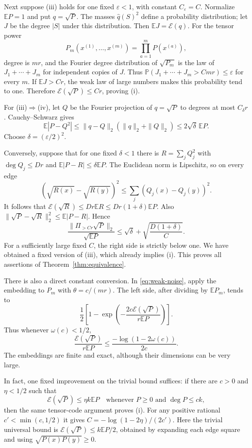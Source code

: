 \documentclass[10pt]{article}
\newcommand{\E}{\mathbb E}
\newcommand{\Prb}{\mathbb P}
\newcommand{\En}{\mathcal E}
\begin{document}
Next suppose (iii) holds for one fixed $\varepsilon<1$, with constant
$C_\varepsilon=C$. Normalize $\E P=1$ and put $q=\sqrt P$.
The masses $\widehat q(S)^2$ define a probability distribution;
let $J$ be the degree $|S|$ under this distribution. Then
$\E J=\En(q)$. For the tensor power
\[
 P_m(x^{(1)},\ldots,x^{(m)})=\prod_{a=1}^mP(x^{(a)}),
\]
degree is $mr$, and the Fourier degree distribution of $\sqrt{P_m}$
is the law of $J_1+\cdots+J_m$ for independent copies of $J$.
Thus $\Prb(J_1+\cdots+J_m>Cmr)\le\varepsilon$ for every $m$.
If $\E J>Cr$, the weak law of large numbers makes this probability
tend to one. Therefore $\En(\sqrt P)\le Cr$, proving (i).

For (iii)$\Rightarrow$(iv), let $Q$ be the Fourier projection of
$q=\sqrt P$ to degrees at most $C_\delta r$. Cauchy--Schwarz gives
\[
 \E|P-Q^2|\le\|q-Q\|_2(\|q\|_2+\|Q\|_2)
       \le2\sqrt\delta\,\E P.
\]
Choose $\delta=(\varepsilon/2)^2$.

Conversely, suppose that for one fixed $\delta<1$ there is
$R=\sum_jQ_j^2$ with $\deg Q_j\le Dr$ and
$\E|P-R|\le\delta\E P$. The Euclidean norm is Lipschitz, so
on every edge
\[
 (\sqrt{R(x)}-\sqrt{R(y)})^2
       \le\sum_j(Q_j(x)-Q_j(y))^2.
\]
It follows that $\En(\sqrt R)\le Dr\E R\le Dr(1+\delta)\E P$.
Also $\|\sqrt P-\sqrt R\|_2^2\le\E|P-R|$. Hence
\[
 \frac{\|\Pi_{>Cr}\sqrt P\|_2}{\sqrt{\E P}}
    \le\sqrt\delta+\sqrt{\frac{D(1+\delta)}C}.
\]
For a sufficiently large fixed $C$, the right side is strictly below
one. We have obtained a fixed version of (iii), which already implies
(i). This proves all assertions of Theorem~\ref{thm:equivalence}.

There is also a direct constant conversion. In \eqref{eq:weak-noise},
apply the embedding to $P_m$ with $\theta=c/(mr)$. The left side,
after dividing by $\E P_m$, tends to
\[
 \frac12\left[1-\exp\left(-\frac{2c\En(\sqrt P)}{r\E P}\right)\right].
\]
Thus whenever $\omega(c)<1/2$,
\begin{equation}\label{eq:constant}
 \frac{\En(\sqrt P)}{r\E P}
       \le\frac{-\log(1-2\omega(c))}{2c}.
\end{equation}
The embeddings are finite and exact, although their dimensions can be
very large.

In fact, one fixed improvement on the trivial bound suffices: if there
are $c>0$ and $\eta<1/2$ such that
\[
 \En(\sqrt P)\le\eta k\E P
 \quad\text{whenever }P\ge0\text{ and }\deg P\le ck,
\]
then the same tensor-code argument proves (i). For any positive rational
$c'<\min(c,1/2)$ it gives
$C=-\log(1-2\eta)/(2c')$. Here the trivial universal bound is
$\En(\sqrt P)\le k\E P/2$, obtained by expanding each edge square
and using $\sqrt{P(x)P(y)}\ge0$.
\end{document}
